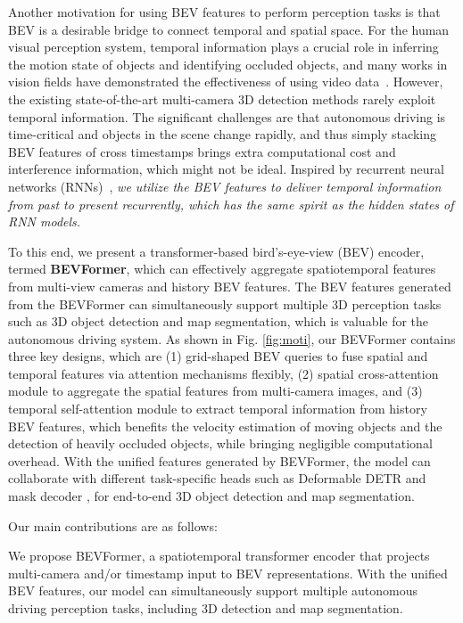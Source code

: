 \documentclass{article}
\begin{document}
Another motivation for using BEV features to perform perception tasks is that BEV is a desirable bridge to connect temporal and spatial space. 
For the human visual perception system, temporal information plays a crucial role in inferring the motion state of objects and identifying occluded objects, and many works in vision fields have demonstrated the effectiveness of using video data~\cite{brazil2020kinematic,ma20223d,luo2018fast,qi2021offboard,kang2016object}.
However, the existing state-of-the-art multi-camera 3D detection methods rarely exploit temporal information.
The significant challenges are that autonomous driving is time-critical and objects in the scene change rapidly, and thus simply stacking BEV features of cross timestamps brings extra computational cost and interference information, which might not be ideal.
Inspired by recurrent neural networks (RNNs)~\cite{hochreiter1997long,cho2014properties}, \emph{we utilize the BEV features to deliver temporal information from past to present recurrently, which has the same spirit as the hidden states of RNN models.}



To this end, we present a transformer-based bird's-eye-view (BEV) encoder, termed \textbf{BEVFormer}, which can effectively aggregate spatiotemporal features from multi-view cameras and history BEV features.
The BEV features generated from the BEVFormer can simultaneously support multiple 3D perception tasks such as 3D object detection and map segmentation, which is valuable for the autonomous driving system.
As shown in Fig. \ref{fig:moti}, our BEVFormer contains three key designs, which are
(1) grid-shaped BEV queries to  fuse spatial and temporal features via attention mechanisms flexibly,
(2) spatial cross-attention module to aggregate the spatial features from multi-camera images,
and (3) temporal self-attention module to extract temporal information from history BEV features, which benefits the velocity estimation of moving objects and the detection of heavily occluded objects, while bringing negligible computational overhead. 
With the unified features generated by BEVFormer,
the model can collaborate with different task-specific heads such as Deformable DETR \cite{zhu2020deformable} and mask decoder \cite{li2021panoptic}, for end-to-end 3D object detection and map segmentation. 



Our main contributions are as follows:

 We propose BEVFormer, a spatiotemporal transformer encoder that  projects multi-camera and/or timestamp input to BEV representations. With the unified BEV features, our model can simultaneously support multiple autonomous driving perception tasks, including 3D detection and map segmentation.
 
\end{document}
